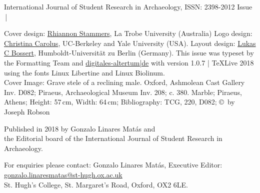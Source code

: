 \IJSRAtitlepage
\clearpage
\mypagesize
\thispagestyle{empty}
\hfill
\vfill

\begin{footnotesize}

\noindent International Journal of Student Research in Archaeology,\newline
ISSN: 2398-2012\newline
Issue \IJSRAnumber\,|\,\IJSRAmonth\ \IJSRAyear
\vspace{2em}


\noindent Cover design: \href{https://latrobe.academia.edu/RhiannonStammers}{Rhiannon Stammers}, La Trobe University (Australia)\newline
\noindent Logo design: \href{https://hraf.yale.edu/about/staff/christina-carolus/}{Christina Carolus}, UC-Berkeley and Yale University (USA).\newline
\noindent Layout design: \href{https://dainst.academia.edu/LukasCBossert}{Lukas C Bossert}, Humboldt-Universität zu Berlin (Germany). \newline \indent This issue was typeset by the Formatting Team and \href{www.digitales-altertum.de}{digitales-altertum|de}  with  version 1.0.7 | \TeX Live 2018 \\ \indent using the fonts Linux Libertine and {\sffamily Linux Biolinum}.\\
Cover Image:
{Grave stele of a reclining male. Oxford, Ashmolean Cast Gallery Inv. D082; Piraeus, Archaeological Museum Inv. 208; c. 380\BC.
Marble; Piraeus, Athens; Height: 57\,cm, Width: 64\,cm; Bibliography: TCG, 220, D082; \copyright\ by Joseph Robson}\\
\vspace{2em}

\noindent Published in 2018 by Gonzalo Linares Matás and \\ the Editorial board of the International Journal of Student Research in Archaeology.




\vspace{2em}






\noindent For enquiries please contact: Gonzalo Linares Matás, Executive Editor:\\ \href{mailto:gonzalo.linaresmatas@st-hugh.ox.ac.uk}{gonzalo.linaresmatas@st-hugh.ox.ac.uk}\\  St. Hugh’s College, St. Margaret’s Road, Oxford, OX2 6LE.


\end{footnotesize}
